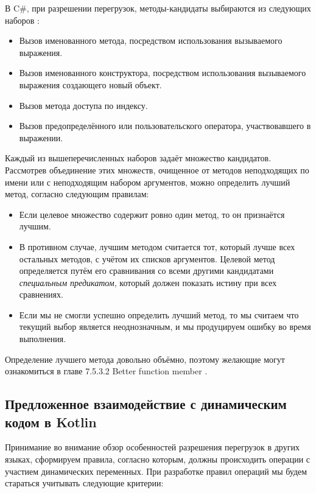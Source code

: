 В C{\#}, при разрешении перегрузок, методы-кандидаты выбираются из следующих наборов \cite{csharp:languageSpecification}:

\begin{itemize}
    \item Вызов именованного метода, посредством использования вызываемого выражения.
    \item Вызов именованного конструктора, посредством использования вызываемого выражения создающего новый объект.
    \item Вызов метода доступа по индексу.
    \item Вызов предопределённого или пользовательского оператора, участвовавшего в выражении.
\end{itemize}

Каждый из вышеперечисленных наборов задаёт множество кандидатов. Рассмотрев объединение этих множеств, очищенное от методов неподходящих по имени или с неподходящим набором аргументов, можно определить лучший метод, согласно следующим правилам:

\begin{itemize}
    \item Если целевое множество содержит ровно один метод, то он признаётся лучшим.
    \item В противном случае, лучшим методом считается тот, который лучше всех остальных методов, с учётом их списков аргументов. Целевой метод определяется путём его сравнивания со всеми другими кандидатами \textit{специальным предикатом}, который должен показать истину при всех сравнениях.
    \item Если мы не смогли успешно определить лучший метод, то мы считаем что текущий выбор является неоднозначным, и мы продуцируем ошибку во время выполнения.
\end{itemize}

Определение лучшего метода довольно объёмно, поэтому желающие могут ознакомиться в главе 7.5.3.2 Better function member \cite{csharp:languageSpecification}.


\subsection{Предложенное взаимодействие с динамическим кодом в Kotlin}

Принимание во внимание обзор особенностей разрешения перегрузок в других языках, сформируем правила, согласно которым, должны происходить операции с участием динамических переменных. При разработке правил операций мы будем стараться учитывать следующие критерии:

